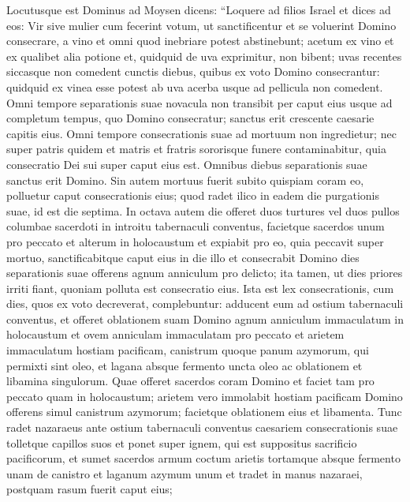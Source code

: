 \begin{biblechapter}  
\verse Locutusque est Dominus ad Moysen dicens: 
\verse “Loquere ad filios Israel et dices ad eos: Vir sive mulier cum fecerint votum, ut sanctificentur et se voluerint Domino consecrare, 
\verse a vino et omni quod inebriare potest abstinebunt; acetum ex vino et ex qualibet alia potione et, quidquid de uva exprimitur, non bibent; uvas recentes siccasque non comedent 
\verse cunctis diebus, quibus ex voto Domino consecrantur: quidquid ex vinea esse potest ab uva acerba usque ad pellicula non comedent. 
\verse Omni tempore separationis suae novacula non transibit per caput eius usque ad completum tempus, quo Domino consecratur; sanctus erit crescente caesarie capitis eius. 
\verse Omni tempore consecrationis suae ad mortuum non ingredietur; 
\verse nec super patris quidem et matris et fratris sororisque funere contaminabitur, quia consecratio Dei sui super caput eius est. 
\verse Omnibus diebus separationis suae sanctus erit Domino. 
\verse Sin autem mortuus fuerit subito quispiam coram eo, polluetur caput consecrationis eius; quod radet ilico in eadem die purgationis suae, id est die septima. 
\verse In octava autem die offeret duos turtures vel duos pullos columbae sacerdoti in introitu tabernaculi conventus, 
\verse facietque sacerdos unum pro peccato et alterum in holocaustum et expiabit pro eo, quia peccavit super mortuo, sanctificabitque caput eius in die illo 
\verse et consecrabit Domino dies separationis suae offerens agnum anniculum pro delicto; ita tamen, ut dies priores irriti fiant, quoniam polluta est consecratio eius. 
\verse Ista est lex consecrationis, cum dies, quos ex voto decreverat, complebuntur: adducent eum ad ostium tabernaculi conventus, 
\verse et offeret oblationem suam Domino agnum anniculum immaculatum in holocaustum et ovem anniculam immaculatam pro peccato et arietem immaculatum hostiam pacificam, 
\verse canistrum quoque panum azymorum, qui permixti sint oleo, et lagana absque fermento uncta oleo ac oblationem et libamina singulorum. 
\verse Quae offeret sacerdos coram Domino et faciet tam pro peccato quam in holocaustum; 
\verse arietem vero immolabit hostiam pacificam Domino offerens simul canistrum azymorum; facietque oblationem eius et libamenta. 
\verse Tunc radet nazaraeus ante ostium tabernaculi conventus caesariem consecrationis suae tolletque capillos suos et ponet super ignem, qui est suppositus sacrificio pacificorum, 
\verse et sumet sacerdos armum coctum arietis tortamque absque fermento unam de canistro et laganum azymum unum et tradet in manus nazaraei, postquam rasum fuerit caput eius; 

\end{biblechapter}
